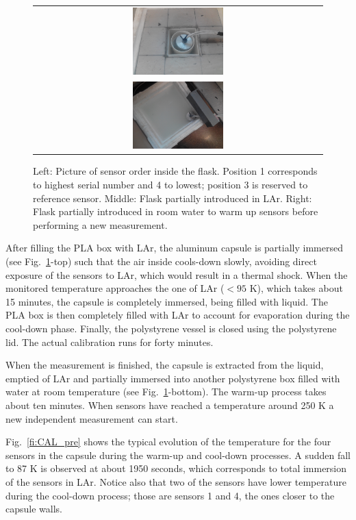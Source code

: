 \begin{figure}[htbp]
\begin{tabular}{ c } 
\includegraphics[width=0.32\textwidth]{images/figure_7_b.jpg} \\
\includegraphics[width=0.32\textwidth]{images/figure_7_c.jpg} 
\end{tabular}
\caption{Left: Picture of sensor order inside the flask. Position 1 corresponds to highest serial number and 4 to lowest; position 3 is reserved to reference sensor.
 Middle: Flask partially introduced in LAr.
 Right: Flask partially introduced in room water to warm up sensors before performing a new measurement.
\label{fi:CAL_procedure}}
\end{figure}

After filling the PLA box with LAr, the aluminum capsule is partially immersed (see Fig.~\ref{fi:CAL_procedure}-top) such that the air inside cools-down slowly, avoiding direct exposure of the sensors to LAr, which would result in a thermal shock. When the monitored temperature approaches the one of LAr ($< 95$ K), which takes about 15 minutes, the capsule is completely immersed, being filled with liquid. The PLA box is then completely filled with LAr to account for evaporation during the cool-down phase. Finally, the polystyrene vessel is closed using the polystyrene lid. The actual calibration runs for forty minutes. 

When the measurement is finished, the capsule is extracted from the liquid, emptied of LAr and partially immersed into another polystyrene box filled with water at room temperature (see Fig.~\ref{fi:CAL_procedure}-bottom). The warm-up process takes about ten minutes. When sensors have reached a temperature around 250 K a new independent measurement can start. 

Fig.~\ref{fi:CAL_pre} shows the typical evolution of the temperature for the four sensors in the capsule during the warm-up and cool-down processes. A sudden fall to 87 K is observed at about 1950 seconds, which corresponds to total immersion of the sensors in LAr. Notice also that two of the sensors have lower temperature during the cool-down process; those are sensors 1 and 4, the ones closer to the capsule walls.  

